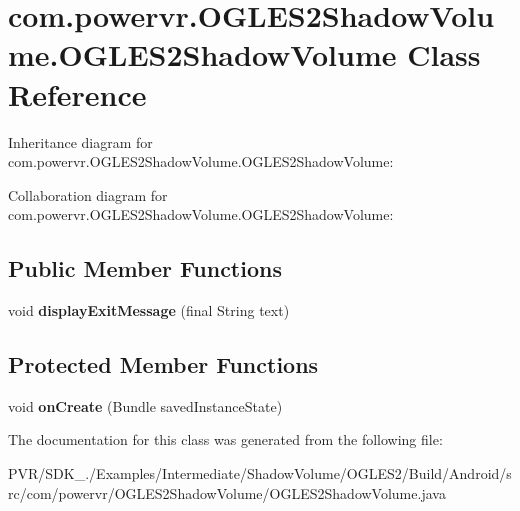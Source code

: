 \hypertarget{classcom_1_1powervr_1_1_o_g_l_e_s2_shadow_volume_1_1_o_g_l_e_s2_shadow_volume}{\section{com.\+powervr.\+O\+G\+L\+E\+S2\+Shadow\+Volume.\+O\+G\+L\+E\+S2\+Shadow\+Volume Class Reference}
\label{classcom_1_1powervr_1_1_o_g_l_e_s2_shadow_volume_1_1_o_g_l_e_s2_shadow_volume}
}


Inheritance diagram for com.\+powervr.\+O\+G\+L\+E\+S2\+Shadow\+Volume.\+O\+G\+L\+E\+S2\+Shadow\+Volume\+:


Collaboration diagram for com.\+powervr.\+O\+G\+L\+E\+S2\+Shadow\+Volume.\+O\+G\+L\+E\+S2\+Shadow\+Volume\+:
\subsection*{Public Member Functions}
\begin{DoxyCompactItemize}
\item 
\hypertarget{classcom_1_1powervr_1_1_o_g_l_e_s2_shadow_volume_1_1_o_g_l_e_s2_shadow_volume_ab412380dfd909aea87b86db1dddf518e}{void {\bfseries display\+Exit\+Message} (final String text)}\label{classcom_1_1powervr_1_1_o_g_l_e_s2_shadow_volume_1_1_o_g_l_e_s2_shadow_volume_ab412380dfd909aea87b86db1dddf518e}

\end{DoxyCompactItemize}
\subsection*{Protected Member Functions}
\begin{DoxyCompactItemize}
\item 
\hypertarget{classcom_1_1powervr_1_1_o_g_l_e_s2_shadow_volume_1_1_o_g_l_e_s2_shadow_volume_ad91c530ba8c322e4f223770a7af331d3}{void {\bfseries on\+Create} (Bundle saved\+Instance\+State)}\label{classcom_1_1powervr_1_1_o_g_l_e_s2_shadow_volume_1_1_o_g_l_e_s2_shadow_volume_ad91c530ba8c322e4f223770a7af331d3}

\end{DoxyCompactItemize}


The documentation for this class was generated from the following file\+:\begin{DoxyCompactItemize}
\item 
P\+V\+R/\+S\+D\+K\+\_./\+Examples/\+Intermediate/\+Shadow\+Volume/\+O\+G\+L\+E\+S2/\+Build/\+Android/src/com/powervr/\+O\+G\+L\+E\+S2\+Shadow\+Volume/O\+G\+L\+E\+S2\+Shadow\+Volume.\+java\end{DoxyCompactItemize}
